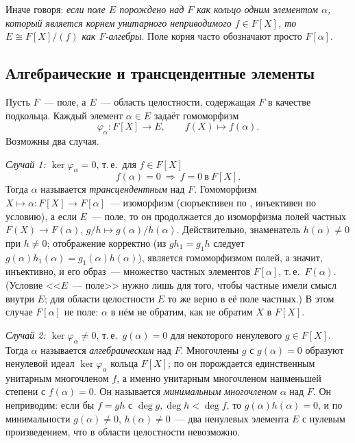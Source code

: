 Иначе говоря: \emph{если поле $E$ порождено над $F$ как кольцо одним элементом $\alpha$, который является корнем
унитарного неприводимого $f\in F[X]$, то $E\cong F[X]/(f)$ как $F$-алгебры}. Поле корня часто обозначают просто $F[\alpha]$.

\subsection*{Алгебраические и трансцендентные элементы}

Пусть $F$~--- поле, а $E$~--- область целостности, содержащая $F$ в качестве подкольца. Каждый элемент $\alpha\in E$
задаёт гомоморфизм
\[
\varphi_\alpha\colon F[X]\to E,\qquad f(X)\mapsto f(\alpha).
\]
Возможны два случая.

\emph{Случай 1: $\ker\varphi_\alpha=0$}, т.\,е.\ для $f\in F[X]$
\[
f(\alpha)=0\ \Longrightarrow\ f=0\ \text{в}\ F[X].
\]
Тогда $\alpha$ называется \emph{трансцендентным} над $F$. Гомоморфизм $X\mapsto\alpha\colon F[X]\to F[\alpha]$~---
изоморфизм (сюръективен по , инъективен по условию), а если $E$~--- поле, то он продолжается до изоморфизма
полей частных $F(X)\to F(\alpha)$, $g/h\mapsto g(\alpha)/h(\alpha)$. Действительно, знаменатель $h(\alpha)\ne0$ при
$h\ne0$; отображение корректно (из $gh_1=g_1h$ следует $g(\alpha)h_1(\alpha)=g_1(\alpha)h(\alpha)$), является
гомоморфизмом полей, а значит, инъективно, и его образ~--- множество частных элементов $F[\alpha]$, т.\,е.\ $F(\alpha)$.
(Условие <<$E$~--- поле>> нужно лишь для того, чтобы частные имели смысл внутри $E$; для области целостности $E$ то же
верно в её поле частных.) В этом случае
$F[\alpha]$ не поле: $\alpha$ в нём не обратим, как не обратим $X$ в $F[X]$.

\emph{Случай 2: $\ker\varphi_\alpha\ne0$}, т.\,е.\ $g(\alpha)=0$ для некоторого ненулевого $g\in F[X]$. Тогда $\alpha$
называется \emph{алгебраическим} над $F$. Многочлены $g$ с $g(\alpha)=0$ образуют ненулевой идеал $\ker\varphi_\alpha$
кольца $F[X]$; по  он порождается единственным унитарным многочленом $f$, а именно унитарным многочленом
наименьшей степени с $f(\alpha)=0$. Он называется \emph{минимальным многочленом} $\alpha$ над $F$. Он неприводим: если бы $f=gh$ с
$\deg g,\deg h<\deg f$, то $g(\alpha)h(\alpha)=0$, и по минимальности $g(\alpha)\ne0$, $h(\alpha)\ne0$~--- два ненулевых
элемента $E$ с нулевым произведением, что в области целостности невозможно.

